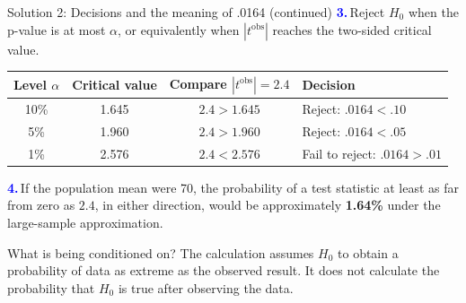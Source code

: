 \documentclass[notes,10pt, aspectratio=169]{beamer}
\newcommand{\answerpart}[1]{\textcolor{blue}{\textbf{#1.}}\,}
\begin{document}
\begin{frame}{Solution 2: Decisions and the meaning of .0164 (continued)}
\small
\answerpart{3}Reject $H_0$ when the p-value is at most $\alpha$, or equivalently when $|t^{\mathrm{obs}}|$ reaches the two-sided critical value.
\begin{center}
\renewcommand{\arraystretch}{1.3}
\begin{tabular}{c|c|c|l}
Level $\alpha$ & Critical value & Compare $|t^{\mathrm{obs}}|=2.4$ & Decision \\ \hline
10\% & 1.645 & $2.4>1.645$ & Reject: $.0164<.10$ \\
5\% & 1.960 & $2.4>1.960$ & Reject: $.0164<.05$ \\
1\% & 2.576 & $2.4<2.576$ & Fail to reject: $.0164>.01$
\end{tabular}
\end{center}
\vspace{.15cm}
\answerpart{4}If the population mean were 70, the probability of a test statistic at least as far from zero as $2.4$, in either direction, would be approximately \textbf{1.64\%} under the large-sample approximation.
\begin{block}{What is being conditioned on?}
The calculation assumes $H_0$ to obtain a probability of data as extreme as the observed result. It does not calculate the probability that $H_0$ is true after observing the data.
\end{block}
\end{frame}
\fi
\end{document}
